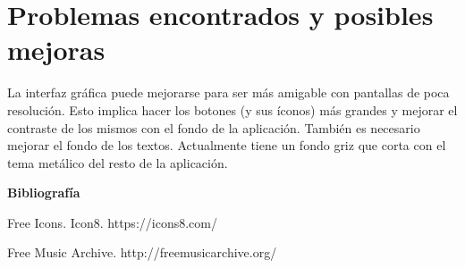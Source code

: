 \section{Problemas encontrados y posibles mejoras}
\label{sec:possible_fixes}

La interfaz gráfica puede mejorarse para ser más amigable con pantallas de poca resolución. Esto
implica hacer los botones (y sus íconos) más grandes y mejorar el contraste de los mismos con el
fondo de la aplicación. También es necesario mejorar el fondo de los textos. Actualmente tiene un
fondo griz que corta con el tema metálico del resto de la aplicación. 


%


\textbf{ Bibliografía}

Free Icons. Icon8. https://icons8.com/

Free Music Archive. http://freemusicarchive.org/
%
%
